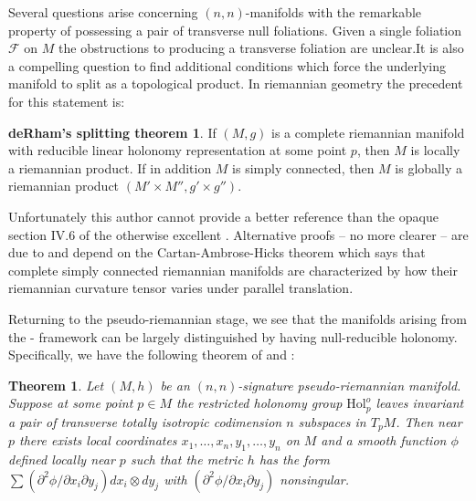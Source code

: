 \documentclass[12pt]{amsart}
\newtheorem{thm}{Theorem}
\theoremstyle{definition}
\newtheorem*{deRham}{deRham's splitting theorem}
\theoremstyle{remark}
\newcommand{\sF}{\mathscr{F}}
\newcommand{\del}{\partial}
\begin{document}
Several questions arise concerning $(n,n)$-manifolds with the remarkable property of possessing a pair of transverse null foliations. Given a single foliation $\sF$ on $M$ the obstructions to producing a transverse foliation are unclear.It is also a compelling question to find additional conditions which force the underlying manifold to split as a topological product. In riemannian geometry the precedent for this statement is: 

\begin{deRham}
If $(M,g)$ is a complete riemannian manifold with reducible linear holonomy representation at some point $p$, then $M$ is locally a riemannian product. If in addition $M$ is simply connected, then $M$ is globally a riemannian product $(M' \times M'', g' \times g'').$ 
\end{deRham}  

Unfortunately this author cannot provide a better reference than the opaque section IV.6 of the otherwise excellent \cite{KN}. Alternative proofs -- no more clearer -- are due to \cite{Wu} and depend on the Cartan-Ambrose-Hicks theorem which says that complete simply connected riemannian manifolds are characterized by how their riemannian curvature tensor varies under parallel translation.


Returning to the pseudo-riemannian stage, we see that the manifolds arising from the \cite{KM}-\cite{KMW} framework can be largely distinguished by having null-reducible holonomy. Specifically, we have the following theorem of \cite{BBI} and \cite{T}:

\begin{thm}\label{pot}
Let $(M,h)$ be an $(n,n)$-signature pseudo-riemannian manifold. Suppose at some point $p\in M$ the restricted holonomy group $\mathrm{Hol}^o_p$ leaves invariant a pair of transverse totally isotropic codimension $n$ subspaces in $T_pM$. Then near $p$ there exists local coordinates $x_1, \ldots, x_n, y_1, \ldots, y_n$ on $M$ and a smooth function $\phi$ defined locally near $p$ such that the metric $h$ has the form $\sum(\del^2 \phi / \del x_i \del y_j) dx_i\otimes dy_j$ with $(\del^2 \phi / \del x_i \del y_j)$ nonsingular. 
\end{thm}\label{bbi}
\end{document}
